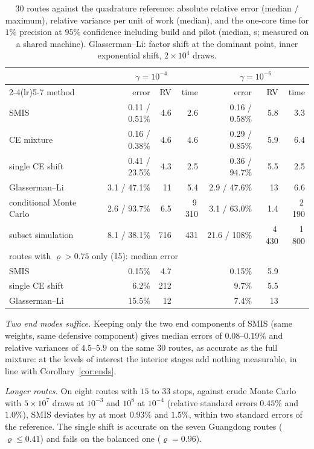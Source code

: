 \documentclass[11pt]{article}
\theoremstyle{definition}
\theoremstyle{remark}
\begin{document}
\begin{table}[t]
\centering\small
\caption{30 routes against the quadrature reference: absolute relative error (median /
maximum), relative variance per unit of work (median), and the one-core time for $1\%$
precision at $95\%$ confidence including build and pilot (median, s; measured on a shared
machine). Glasserman--Li: factor shift at the dominant point, inner exponential shift,
$2\times10^4$ draws.}
\label{tab:rivals}
\begin{tabular}{lrrrrrr}
\toprule
 & \multicolumn{3}{c}{$\gamma=10^{-4}$} & \multicolumn{3}{c}{$\gamma=10^{-6}$} \\
\cmidrule(lr){2-4}\cmidrule(lr){5-7}
method & error & RV & time & error & RV & time \\
\midrule
SMIS & 0.11 / 0.51\% & 4.6 & 2.6 & 0.16 / 0.58\% & 5.8 & 3.3 \\
CE mixture & 0.16 / 0.38\% & 4.6 & 4.6 & 0.29 / 0.85\% & 5.9 & 6.4 \\
single CE shift & 0.41 / 23.5\% & 4.3 & 2.5 & 0.36 / 94.7\% & 5.5 & 2.5 \\
Glasserman--Li & 3.1 / 47.1\% & 11 & 5.4 & 2.9 / 47.6\% & 13 & 6.6 \\
conditional Monte Carlo & 2.6 / 93.7\% & 6.5 & 9\,310 & 3.1 / 63.0\% & 1.4 & 2\,190 \\
subset simulation & 8.1 / 38.1\% & 716 & 431 & 21.6 / 108\% & 4\,430 & 1\,800 \\
\midrule
\multicolumn{7}{l}{routes with $\varrho>0.75$ only (15): median error} \\
SMIS & 0.15\% & 4.7 & & 0.15\% & 5.9 & \\
single CE shift & 6.2\% & 212 & & 9.7\% & 5.5 & \\
Glasserman--Li & 15.5\% & 12 & & 7.4\% & 13 & \\
\bottomrule
\end{tabular}
\end{table}

\emph{Two end modes suffice.} Keeping only the two end components of SMIS (same weights,
same defensive component) gives median errors of $0.08$--$0.19\%$ and relative variances
of $4.5$--$5.9$ on the same 30 routes, as accurate as the full mixture: at the levels of
interest the interior stages add nothing measurable, in line with
Corollary~\ref{cor:ends}.

\emph{Longer routes.} On eight routes with $15$ to $33$ stops, against crude Monte Carlo
with $5\times10^7$ draws at $10^{-3}$ and $10^8$ at $10^{-4}$ (relative standard errors
$0.45\%$ and $1.0\%$), SMIS deviates by at most $0.93\%$ and $1.5\%$, within two standard
errors of the reference. The single shift is accurate on the seven Guangdong routes
($\varrho\le0.41$) and fails on the balanced one ($\varrho=0.96$).
\end{document}
